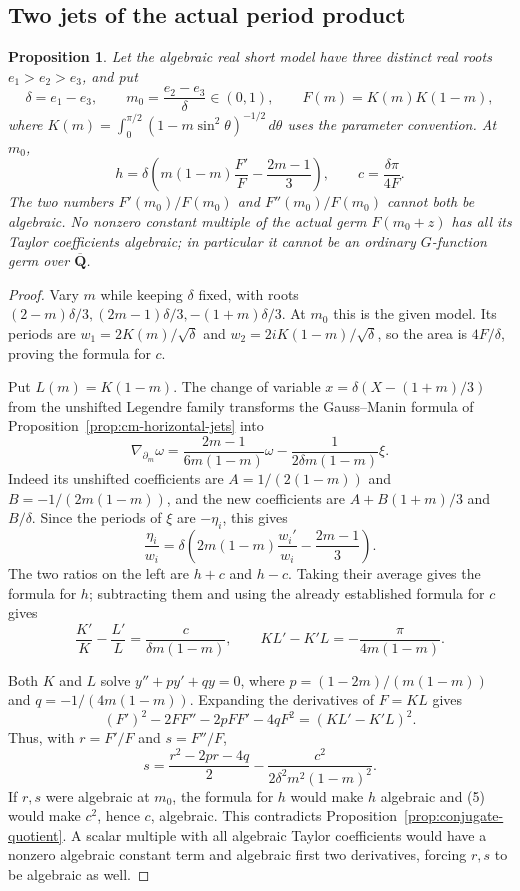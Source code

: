 \documentclass[11pt]{article}
\newtheorem{proposition}[theorem]{Proposition}
\theoremstyle{definition}\newtheorem{definition}[theorem]{Definition}
\theoremstyle{remark}\newtheorem{remark}[theorem]{Remark}
\newcommand{\Qb}{\overline{\mathbf Q}}\newcommand{\Fp}{\mathbf F_p}
\begin{document}
\subsection{Two jets of the actual period product}
\begin{proposition}\label{prop:period-product-jets}
Let the algebraic real short model have three distinct real roots $e_1>e_2>e_3$, and put
\[
 \delta=e_1-e_3,\qquad m_0=\frac{e_2-e_3}{\delta}\in(0,1),
 \qquad F(m)=K(m)K(1-m),
\]
where $K(m)=\int_0^{\pi/2}(1-m\sin^2\theta)^{-1/2}\,d\theta$ uses the parameter convention. At $m_0$,
\[
 h=\delta\left(m(1-m)\frac{F'}F-\frac{2m-1}{3}\right),
 \qquad c=\frac{\delta\pi}{4F}.
\]
The two numbers $F'(m_0)/F(m_0)$ and $F''(m_0)/F(m_0)$ cannot both be algebraic. No nonzero constant multiple of the actual germ $F(m_0+z)$ has all its Taylor coefficients algebraic; in particular it cannot be an ordinary $G$-function germ over $\Qb$.
\end{proposition}
\begin{proof}
Vary $m$ while keeping $\delta$ fixed, with roots
$(2-m)\delta/3,(2m-1)\delta/3,-(1+m)\delta/3$. At $m_0$ this is the given model. Its periods are $w_1=2K(m)/\sqrt\delta$ and $w_2=2iK(1-m)/\sqrt\delta$, so the area is $4F/\delta$, proving the formula for $c$.

Put $L(m)=K(1-m)$. The change of variable
$x=\delta(X-(1+m)/3)$ from the unshifted Legendre family transforms the Gauss--Manin formula of Proposition~\ref{prop:cm-horizontal-jets} into
\[
 \nabla_{\partial_m}\omega
 =\frac{2m-1}{6m(1-m)}\omega
            -\frac1{2\delta m(1-m)}\xi.
\]
Indeed its unshifted coefficients are $A=1/(2(1-m))$ and $B=-1/(2m(1-m))$, and the new coefficients are $A+B(1+m)/3$ and $B/\delta$. Since the periods of $\xi$ are $-\eta_i$, this gives
\[
 \frac{\eta_i}{w_i}
   =\delta\left(2m(1-m)\frac{w_i'}{w_i}-\frac{2m-1}{3}\right).
\]
The two ratios on the left are $h+c$ and $h-c$. Taking their average gives the formula for $h$; subtracting them and using the already established formula for $c$ gives
\[
 \frac{K'}K-\frac{L'}L=\frac{c}{\delta m(1-m)},
 \qquad KL'-K'L=-\frac\pi{4m(1-m)}.
\]

Both $K$ and $L$ solve $y''+py'+qy=0$, where
$p=(1-2m)/(m(1-m))$ and $q=-1/(4m(1-m))$. Expanding the derivatives of $F=KL$ gives
\[
 (F')^2-2FF''-2pFF'-4qF^2=(KL'-K'L)^2.
\]
Thus, with $r=F'/F$ and $s=F''/F$,
\[
 s=\frac{r^2-2pr-4q}{2}
           -\frac{c^2}{2\delta^2m^2(1-m)^2}.             \tag{5}
\]
If $r,s$ were algebraic at $m_0$, the formula for $h$ would make $h$ algebraic and (5) would make $c^2$, hence $c$, algebraic. This contradicts Proposition~\ref{prop:conjugate-quotient}. A scalar multiple with all algebraic Taylor coefficients would have a nonzero algebraic constant term and algebraic first two derivatives, forcing $r,s$ to be algebraic as well.
\end{proof}
\end{document}
